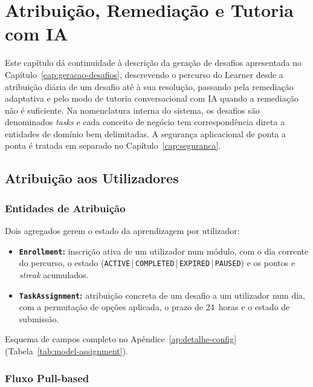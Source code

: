 %
%
\chapter{Atribuição, Remediação e Tutoria com IA} \label{cap:desafios}

Este capítulo dá continuidade à descrição da geração de desafios apresentada no Capítulo~\ref{cap:geracao-desafios}, descrevendo o percurso do Learner desde a atribuição diária de um desafio até à sua resolução, passando pela remediação adaptativa e pelo modo de tutoria conversacional com IA quando a remediação não é suficiente. Na nomenclatura interna do sistema, os desafios são denominados \textit{tasks} e cada conceito de negócio tem correspondência direta a entidades de domínio bem delimitadas. A segurança aplicacional de ponta a ponta é tratada em separado no Capítulo~\ref{cap:seguranca}.

\section{Atribuição aos Utilizadores} \label{sec:atribuicao}

\subsection*{Entidades de Atribuição}

Dois agregados gerem o estado da aprendizagem por utilizador:

\begin{itemize}
    \item \textbf{\texttt{Enrollment}:} inscrição ativa de um utilizador num módulo, com o dia corrente do percurso, o estado (\texttt{ACTIVE}\,|\,\texttt{COMPLETED}\,|\,\texttt{EXPIRED}\,|\,\texttt{PAUSED}) e os pontos e \textit{streak} acumulados.
    \item \textbf{\texttt{TaskAssignment}:} atribuição concreta de um desafio a um utilizador num dia, com a permutação de opções aplicada, o prazo de 24~horas e o estado de submissão.
\end{itemize}
Esquema de campos completo no Apêndice~\ref{ap:detalhe-config} (Tabela~\ref{tab:model-assignment}).

\subsection*{Fluxo Pull-based}

